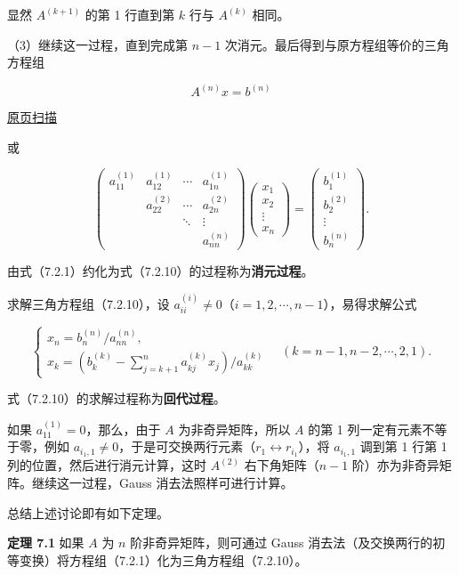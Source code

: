 \documentclass[
  10pt,
  fontset=fandol]{ctexart}
\begin{document}
显然 \(A^{(k+1)}\) 的第 1 行直到第 \(k\) 行与 \(A^{(k)}\) 相同。

（3）继续这一过程，直到完成第 \(n-1\) 次消元。最后得到与原方程组等价的三角方程组

\[A^{(n)}x=b^{(n)}\tag{7.2.10}\]

\href{../../source-images/pdf-180.jpeg}{原页扫描}

或

\[
\begin{pmatrix}
a_{11}^{(1)}&a_{12}^{(1)}&\cdots&a_{1n}^{(1)}\\
&a_{22}^{(2)}&\cdots&a_{2n}^{(2)}\\
&&\ddots&\vdots\\
&&&a_{nn}^{(n)}
\end{pmatrix}
\begin{pmatrix}x_1\\x_2\\\vdots\\x_n\end{pmatrix}
=\begin{pmatrix}b_1^{(1)}\\b_2^{(2)}\\\vdots\\b_n^{(n)}\end{pmatrix}.
\]

由式（7.2.1）约化为式（7.2.10）的过程称为\textbf{消元过程}。

求解三角方程组（7.2.10），设 \(a_{ii}^{(i)}\ne0\)（\(i=1,2,\cdots,n-1\)），易得求解公式

\[
\begin{cases}
x_n=b_n^{(n)}/a_{nn}^{(n)},\\
x_k=\displaystyle\left(b_k^{(k)}-\sum_{j=k+1}^{n}a_{kj}^{(k)}x_j\right)/a_{kk}^{(k)}
\end{cases}
\quad(k=n-1,n-2,\cdots,2,1).
\tag{7.2.11}
\]

式（7.2.10）的求解过程称为\textbf{回代过程}。

如果 \(a_{11}^{(1)}=0\)，那么，由于 \(A\) 为非奇异矩阵，所以 \(A\) 的第 1 列一定有元素不等于零，例如 \(a_{i_1,1}\ne0\)，于是可交换两行元素（\(r_1\leftrightarrow r_{i_1}\)），将 \(a_{i_1,1}\) 调到第 1 行第 1 列的位置，然后进行消元计算，这时 \(A^{(2)}\) 右下角矩阵（\(n-1\) 阶）亦为非奇异矩阵。继续这一过程，Gauss 消去法照样可进行计算。

总结上述讨论即有如下定理。

\textbf{定理 7.1} 如果 \(A\) 为 \(n\) 阶非奇异矩阵，则可通过 Gauss 消去法（及交换两行的初等变换）将方程组（7.2.1）化为三角方程组（7.2.10）。
\end{document}
